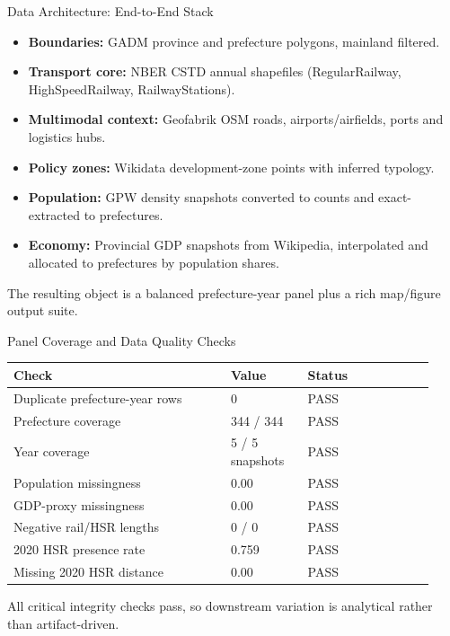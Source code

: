 \documentclass[aspectratio=169]{beamer}
\begin{document}
\begin{frame}{Data Architecture: End-to-End Stack}
\small
\begin{itemize}
  \item \textbf{Boundaries:} GADM province and prefecture polygons, mainland filtered.
  \item \textbf{Transport core:} NBER CSTD annual shapefiles (RegularRailway, HighSpeedRailway, RailwayStations).
  \item \textbf{Multimodal context:} Geofabrik OSM roads, airports/airfields, ports and logistics hubs.
  \item \textbf{Policy zones:} Wikidata development-zone points with inferred typology.
  \item \textbf{Population:} GPW density snapshots converted to counts and exact-extracted to prefectures.
  \item \textbf{Economy:} Provincial GDP snapshots from Wikipedia, interpolated and allocated to prefectures by population shares.
\end{itemize}
\vspace{0.3em}
The resulting object is a balanced prefecture-year panel plus a rich map/figure output suite.
\end{frame}

\begin{frame}{Panel Coverage and Data Quality Checks}
\small
\begin{table}
\centering
\begin{tabular}{p{0.48\linewidth} p{0.17\linewidth} p{0.28\linewidth}}
\toprule
Check & Value & Status \\
\midrule
Duplicate prefecture-year rows & 0 & PASS \\
Prefecture coverage & 344 / 344 & PASS \\
Year coverage & 5 / 5 snapshots & PASS \\
Population missingness & 0.00 & PASS \\
GDP-proxy missingness & 0.00 & PASS \\
Negative rail/HSR lengths & 0 / 0 & PASS \\
2020 HSR presence rate & 0.759 & PASS \\
Missing 2020 HSR distance & 0.00 & PASS \\
\bottomrule
\end{tabular}
\end{table}
\smallskip
All critical integrity checks pass, so downstream variation is analytical rather than artifact-driven.
\end{frame}
\end{document}
